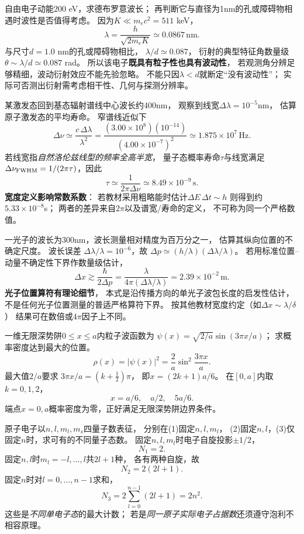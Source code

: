 \problemtext 自由电子动能$200$ eV，求德布罗意波长；
再判断它与直径为1nm的孔或障碍物相遇时波性是否值得考虑。
\workings
因为$K\ll m_ec^2=511$ keV，
\[
\boxed{\lambda=\frac{h}{\sqrt{2m_eK}}
\simeq0.0867\,\mathrm{nm}}.
\]
与尺寸$d=1.0$ nm的孔或障碍物相比，
$\lambda/d\simeq0.087$，
衍射的典型特征角数量级
$\theta\sim\lambda/d\simeq0.087$ rad。
所以该电子\textbf{既具有粒子性也具有波动性}，
若观测角分辨足够精细，波动衍射效应不能先验忽略。
\crosscheck 不能只因$\lambda<d$就断定“没有波动性”；
实际可否测出衍射需考虑相干性、几何与探测分辨率。

\problemtext 某激发态回到基态辐射谱线中心波长约400nm，
观察到线宽$\Delta\lambda=10^{-5}$nm，
估算原子激发态的平均寿命。
\workings
窄谱线近似下
\[
\Delta\nu\simeq\frac{c\,\Delta\lambda}{\lambda^2}
=\frac{(3.00\times10^8)(10^{-14})}{(4.00\times10^{-7})^2}
\simeq1.875\times10^7\,\mathrm{Hz}.
\]
若线宽指\emph{自然洛伦兹线型的频率全高半宽}，
量子态概率寿命$\tau$与线宽满足
$\Delta\nu_{\rm FWHM}=1/(2\pi\tau)$，因此
\[
\boxed{\tau\simeq\frac1{2\pi\Delta\nu}
\simeq8.49\times10^{-9}\,\mathrm s}.
\]
\crosscheck \textbf{宽度定义影响常数系数}：
若教材采用粗略能时估计$\Delta E\,\Delta t\sim h$
则得到约$5.33\times10^{-8}$s；
两者的差异来自$2\pi$以及谱宽/寿命的定义，
不可称为同一个严格数值。

\problemtext 一光子的波长为300nm，波长测量相对精度为百万分之一，
估算其纵向位置的不确定尺度。
\workings
波长误差
$\Delta\lambda/\lambda=10^{-6}$，故
$\Delta p\simeq(h/\lambda)(\Delta\lambda/\lambda)$。
若用标准位置--动量不确定性下界作数量级估计，
\[
\Delta x\gtrsim\frac{\hbar}{2\Delta p}
=\frac{\lambda}{4\pi(\Delta\lambda/\lambda)}
=\boxed{2.39\times10^{-2}\,\mathrm m}.
\]
\crosscheck \textbf{光子位置算符有理论细节}，
本式是沿传播方向的单光子波包长度的启发性估计，
不是任何光子位置测量的普适严格算符下界。
按其他教材宽度约定（如$\Delta x\sim\lambda/\delta$）
结果可在数倍或$4\pi$因子上不同。

\problemtext 一维无限深势阱$0\le x\le a$内粒子波函数为
$\psi(x)=\sqrt{2/a}\sin(3\pi x/a)$；
求概率密度达到最大的位置。
\workings
\[
\rho(x)=|\psi(x)|^2=\frac2a\sin^2\frac{3\pi x}{a}.
\]
最大值$2/a$要求
$3\pi x/a=(k+\tfrac12)\pi$，
即$x=(2k+1)a/6$。
在$[0,a]$内取$k=0,1,2$，
\[
\boxed{x=a/6,\quad a/2,\quad 5a/6}.
\]
\crosscheck 端点$x=0,a$概率密度为零，正好满足无限深势阱边界条件。

\problemtext 原子电子以$n,l,m_l,m_s$四量子数表征，
分别在(1)固定$n,l,m_l$，
(2)固定$n,l$，(3)仅固定$n$时，求可有的不同量子态数。
\workings
固定$n,l,m_l$时电子自旋投影$\pm1/2$，
\[
\boxed{N_1=2}.
\]
固定$n,l$时$m_l=-l,\ldots,l$共$2l+1$种，
各有两种自旋，故
\[
\boxed{N_2=2(2l+1)}.
\]
固定$n$时对$l=0,\ldots,n-1$求和，
\[
\boxed{N_3=2\sum_{l=0}^{n-1}(2l+1)=2n^2}.
\]
\crosscheck 这些是\emph{不同单电子态}的最大计数；
若是\emph{同一原子实际电子占据数}还须遵守泡利不相容原理。
